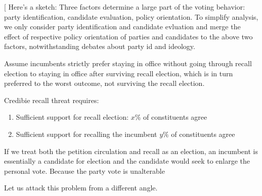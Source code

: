 \documentclass[hyphens, crop=false]{standalone}
\begin{document}
		[
		Here's a sketch:
		Three factors determine a large part of the voting behavior:
		party identification,
		candidate evaluation,
		policy orientation.
		To simplify analysis, we only consider party identification and candidate evluation
		and merge the effect of respective policy orientation of parties and candidates to the above two factors,
		notwithstanding debates about party id and ideology.
		
		Assume incumbents strictly prefer staying in office without going through recall election
		to staying in office after surviving recall election,
		which is in turn preferred to the worst outcome, not surviving the recall election.
		
		Credibie recall threat requires:
		\begin{enumerate}
			\item 
			Sufficient support for recall election:
			$x\%$ of constituents agree
			\item 
			Sufficient support for recalling the incumbent
			$y\%$ of constituents agree
		\end{enumerate}
		If we treat both the petition circulation and recall as an election,
		an incumbent is essentially a candidate for election
		and the candidate would seek to enlarge the personal vote.
		Because the party vote is unalterable
		
		
		
		
		
		Let us attack this problem from a different angle.
		
\end{document}
